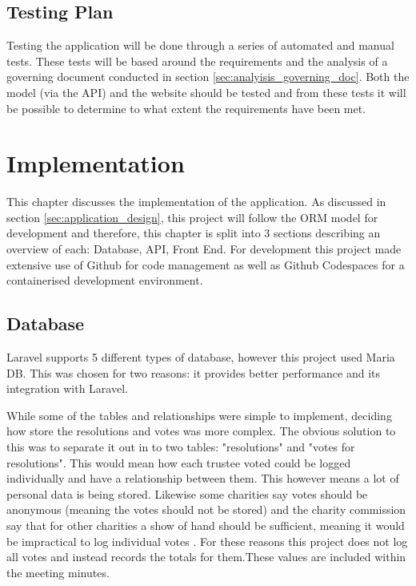 \documentclass{UoYCSproject}
\begin{document}
\section{Testing Plan}
Testing the application will be done through a series of automated and manual tests. These tests will be based around the requirements and the analysis of a governing document conducted in section \ref{sec:analyisis_governing_doc}. Both the model (via the API) and the website should be tested and from these tests it will be possible to determine to what extent the requirements have been met.

\chapter{Implementation}
\label{cha:implementation}
This chapter discusses the implementation of the application. As discussed in section \ref{sec:application_design}, this project will follow the ORM model for development and therefore, this chapter is split into 3 sections describing an overview of each: Database, API, Front End. For development this project made extensive use of Github for code management as well as Github Codespaces for a containerised development environment. 

\section{Database}
\label{sec:database}
Laravel supports 5 different types of database, however this project used Maria DB. This was chosen for two reasons: it provides better performance and its integration with Laravel.

While some of the tables and relationships were simple to implement, deciding how store the resolutions and votes was more complex. The obvious solution to this was to separate it out in to two tables: "resolutions" and "votes for resolutions". This would mean how each trustee voted could be logged individually and have a relationship between them. This however means a lot of personal data is being stored. Likewise some charities say votes should be anonymous (meaning the votes should not be stored) and the charity commission say that for other charities a show of hand should be sufficient, meaning it would be impractical to log individual votes \cite{charity_commission_making_decisions}. For these reasons this project does not log all votes and instead records the totals for them.These values are included within the meeting minutes. 
\end{document}
